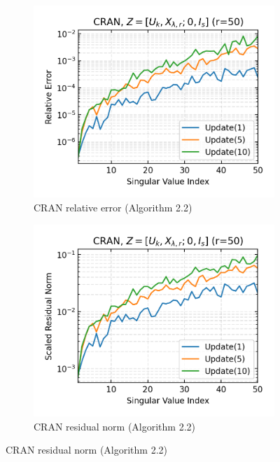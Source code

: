 \begin{figure}
    \begin{subfigure}[b]{0.48\textwidth}
    \centering
    \includegraphics[width=\textwidth]{figures/cran/CRAN_bcg_n_batches_10_k_dims_50_rval_50_rel_err.png}
    \caption{CRAN relative error (Algorithm 2.2)}
  \end{subfigure}
  \hfill
  \begin{subfigure}[b]{0.48\textwidth}
    \centering
    \includegraphics[width=\textwidth]{figures/cran/CRAN_bcg_n_batches_10_k_dims_50_rval_50_res_norm.png}
    \caption{CRAN residual norm (Algorithm 2.2)}
  \end{subfigure}
 \end{figure}
 
